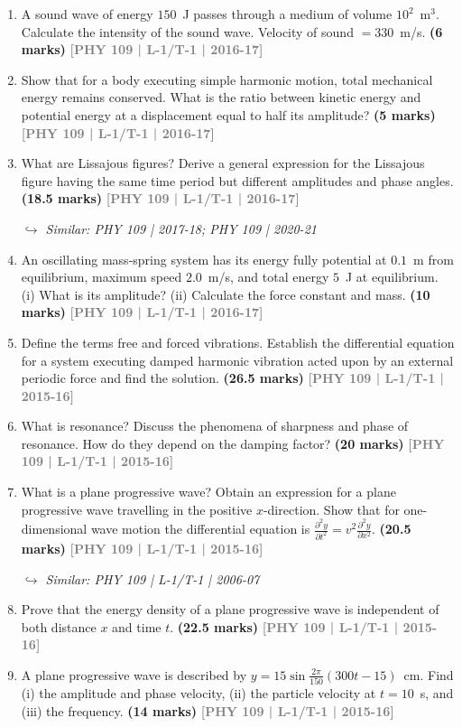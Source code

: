 \documentclass[12pt,a3paper]{article}
\newcommand{\yr}[1]{\hfill\textcolor{gray}{\small\textbf{[#1]}}}
\newcommand{\mk}[1]{\textcolor{orange!70!black}{\small\textbf{(#1 marks)}}}
\newcommand{\variant}[1]{\par\vspace{1pt}\textcolor{blue!50!black}%
  {\footnotesize\textit{$\hookrightarrow$ Similar: #1}}}
\begin{document}
\begin{enumerate}
\item A sound wave of energy $150$~J passes through a medium of volume $10^2$~m$^3$. Calculate the intensity of the sound wave. Velocity of sound $= 330$~m/s.
\mk{6} \yr{PHY 109 | L-1/T-1 | 2016-17}

\item Show that for a body executing simple harmonic motion, total mechanical energy remains conserved. What is the ratio between kinetic energy and potential energy at a displacement equal to half its amplitude?
\mk{5} \yr{PHY 109 | L-1/T-1 | 2016-17}

\item What are Lissajous figures? Derive a general expression for the Lissajous figure having the same time period but different amplitudes and phase angles.
\mk{18.5} \yr{PHY 109 | L-1/T-1 | 2016-17}
\variant{PHY 109 | 2017-18; PHY 109 | 2020-21}

\item An oscillating mass-spring system has its energy fully potential at $0.1$~m from equilibrium, maximum speed $2.0$~m/s, and total energy $5$~J at equilibrium. (i) What is its amplitude? (ii) Calculate the force constant and mass.
\mk{10} \yr{PHY 109 | L-1/T-1 | 2016-17}

\item Define the terms free and forced vibrations. Establish the differential equation for a system executing damped harmonic vibration acted upon by an external periodic force and find the solution.
\mk{26.5} \yr{PHY 109 | L-1/T-1 | 2015-16}

\item What is resonance? Discuss the phenomena of sharpness and phase of resonance. How do they depend on the damping factor?
\mk{20} \yr{PHY 109 | L-1/T-1 | 2015-16}

\item What is a plane progressive wave? Obtain an expression for a plane progressive wave travelling in the positive $x$-direction. Show that for one-dimensional wave motion the differential equation is $\frac{\partial^2 y}{\partial t^2} = v^2 \frac{\partial^2 y}{\partial x^2}$.
\mk{20.5} \yr{PHY 109 | L-1/T-1 | 2015-16}
\variant{PHY 109 | L-1/T-1 | 2006-07}

\item Prove that the energy density of a plane progressive wave is independent of both distance $x$ and time $t$.
\mk{22.5} \yr{PHY 109 | L-1/T-1 | 2015-16}

\item A plane progressive wave is described by $y = 15\sin\frac{2\pi}{150}(300t - 15)$~cm. Find (i) the amplitude and phase velocity, (ii) the particle velocity at $t = 10$~s, and (iii) the frequency.
\mk{14} \yr{PHY 109 | L-1/T-1 | 2015-16}


\end{enumerate}
\end{document}
